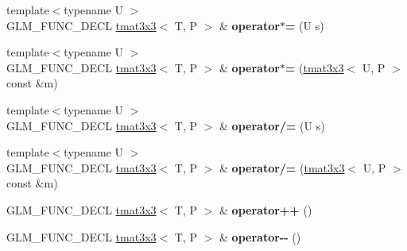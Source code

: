 \begin{DoxyCompactItemize}
\item 
\hypertarget{structglm_1_1detail_1_1tmat3x3_ad720ed5f090b44ffc9de39e217e14778}{{\footnotesize template$<$typename U $>$ }\\G\-L\-M\-\_\-\-F\-U\-N\-C\-\_\-\-D\-E\-C\-L \hyperlink{structglm_1_1detail_1_1tmat3x3}{tmat3x3}$<$ T, P $>$ \& {\bfseries operator$\ast$=} (U s)}\label{structglm_1_1detail_1_1tmat3x3_ad720ed5f090b44ffc9de39e217e14778}

\item 
\hypertarget{structglm_1_1detail_1_1tmat3x3_a688e29783f988517fec9fb416af1b54e}{{\footnotesize template$<$typename U $>$ }\\G\-L\-M\-\_\-\-F\-U\-N\-C\-\_\-\-D\-E\-C\-L \hyperlink{structglm_1_1detail_1_1tmat3x3}{tmat3x3}$<$ T, P $>$ \& {\bfseries operator$\ast$=} (\hyperlink{structglm_1_1detail_1_1tmat3x3}{tmat3x3}$<$ U, P $>$ const \&m)}\label{structglm_1_1detail_1_1tmat3x3_a688e29783f988517fec9fb416af1b54e}

\item 
\hypertarget{structglm_1_1detail_1_1tmat3x3_afb56c9bce7eef169c698fe459a91c402}{{\footnotesize template$<$typename U $>$ }\\G\-L\-M\-\_\-\-F\-U\-N\-C\-\_\-\-D\-E\-C\-L \hyperlink{structglm_1_1detail_1_1tmat3x3}{tmat3x3}$<$ T, P $>$ \& {\bfseries operator/=} (U s)}\label{structglm_1_1detail_1_1tmat3x3_afb56c9bce7eef169c698fe459a91c402}

\item 
\hypertarget{structglm_1_1detail_1_1tmat3x3_a78341f4a3d5353411c69f40e0b9b9560}{{\footnotesize template$<$typename U $>$ }\\G\-L\-M\-\_\-\-F\-U\-N\-C\-\_\-\-D\-E\-C\-L \hyperlink{structglm_1_1detail_1_1tmat3x3}{tmat3x3}$<$ T, P $>$ \& {\bfseries operator/=} (\hyperlink{structglm_1_1detail_1_1tmat3x3}{tmat3x3}$<$ U, P $>$ const \&m)}\label{structglm_1_1detail_1_1tmat3x3_a78341f4a3d5353411c69f40e0b9b9560}

\item 
\hypertarget{structglm_1_1detail_1_1tmat3x3_aba962e910e7a5e3de57b14c4215ec471}{G\-L\-M\-\_\-\-F\-U\-N\-C\-\_\-\-D\-E\-C\-L \hyperlink{structglm_1_1detail_1_1tmat3x3}{tmat3x3}$<$ T, P $>$ \& {\bfseries operator++} ()}\label{structglm_1_1detail_1_1tmat3x3_aba962e910e7a5e3de57b14c4215ec471}

\item 
\hypertarget{structglm_1_1detail_1_1tmat3x3_a00ca964c42c36a5472103aa3a9b375fc}{G\-L\-M\-\_\-\-F\-U\-N\-C\-\_\-\-D\-E\-C\-L \hyperlink{structglm_1_1detail_1_1tmat3x3}{tmat3x3}$<$ T, P $>$ \& {\bfseries operator-\/-\/} ()}\label{structglm_1_1detail_1_1tmat3x3_a00ca964c42c36a5472103aa3a9b375fc}


\end{DoxyCompactItemize}

